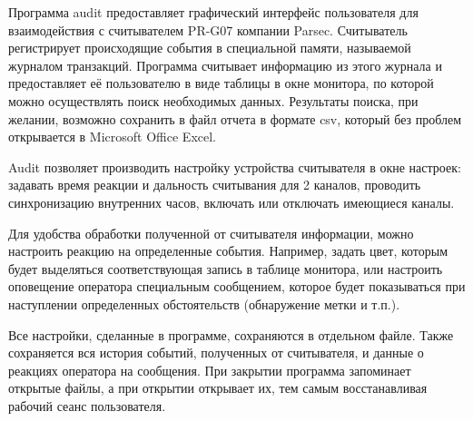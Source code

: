 ﻿Программа audit предоставляет графический интерфейс пользователя для взаимодействия с считывателем 
PR-G07 компании Parsec. Считыватель регистрирует происходящие события в специальной памяти,
называемой журналом транзакций. Программа считывает информацию из этого журнала и предоставляет её 
пользователю в виде таблицы в окне монитора, по которой можно осуществлять поиск необходимых данных. Результаты поиска,
при желании, возможно сохранить в файл отчета в формате csv, который без проблем открывается в Microsoft 
Office Excel.

Audit позволяет производить настройку устройства считывателя в окне настроек: задавать время реакции и дальность считывания
для 2 каналов, проводить синхронизацию внутренних часов, включать или отключать имеющиеся каналы.

Для удобства обработки полученной от считывателя информации, можно настроить реакцию на определенные 
события. Например, задать цвет, которым будет выделяться соответствующая запись в таблице монитора, или 
настроить оповещение оператора специальным сообщением, которое будет показываться при наступлении
определенных обстоятельств (обнаружение метки и т.п.). 

Все настройки, сделанные в программе, сохраняются в отдельном файле. Также сохраняется вся история 
событий, полученных от считывателя, и данные о реакциях оператора на сообщения. При закрытии программа
запоминает открытые файлы, а при открытии открывает их, тем самым восстанавливая рабочий сеанс пользователя.